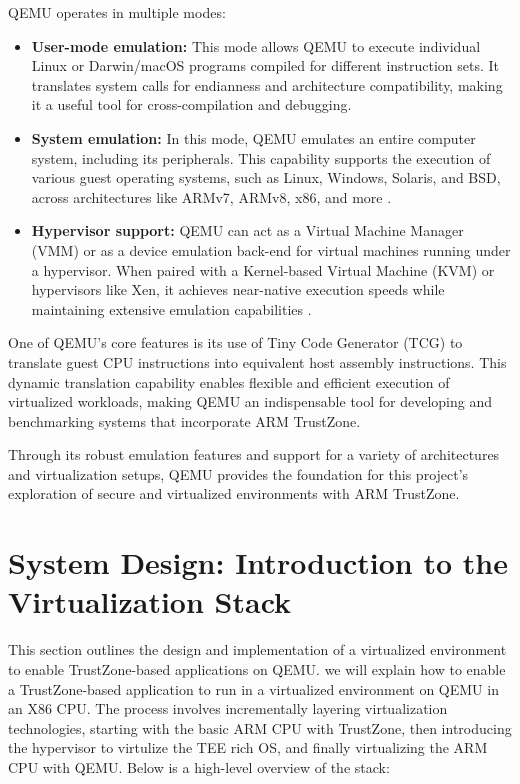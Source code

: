 \documentclass[acmtog]{acmart}
\begin{document}
QEMU operates in multiple modes:
\begin{itemize}
    \item \textbf{User-mode emulation:} This mode allows QEMU to execute individual Linux or Darwin/macOS programs compiled for different instruction sets. It translates system calls for endianness and architecture compatibility, making it a useful tool for cross-compilation and debugging.
    \item \textbf{System emulation:} In this mode, QEMU emulates an entire computer system, including its peripherals. This capability supports the execution of various guest operating systems, such as Linux, Windows, Solaris, and BSD, across architectures like ARMv7, ARMv8, x86, and more \cite{qemu_fast_portable}.
    \item \textbf{Hypervisor support:} QEMU can act as a Virtual Machine Manager (VMM) or as a device emulation back-end for virtual machines running under a hypervisor. When paired with a Kernel-based Virtual Machine (KVM) or hypervisors like Xen, it achieves near-native execution speeds while maintaining extensive emulation capabilities \cite{partemu}.
\end{itemize}

One of QEMU's core features is its use of Tiny Code Generator (TCG) to translate guest CPU instructions into equivalent host assembly instructions. This dynamic translation capability enables flexible and efficient execution of virtualized workloads, making QEMU an indispensable tool for developing and benchmarking systems that incorporate ARM TrustZone.

Through its robust emulation features and support for a variety of architectures and virtualization setups, QEMU provides the foundation for this project's exploration of secure and virtualized environments with ARM TrustZone.




\section{System Design: Introduction to the Virtualization Stack}

This section outlines the design and implementation of a virtualized environment to enable TrustZone-based applications on QEMU. we will explain how to enable a TrustZone-based application to run in a virtualized environment on QEMU in an X86 CPU. The process involves incrementally layering virtualization technologies, starting with the basic ARM CPU with TrustZone, then introducing the hypervisor to virtulize the TEE rich OS, and finally virtualizing the ARM CPU with QEMU. Below is a high-level overview of the stack:
\end{document}
